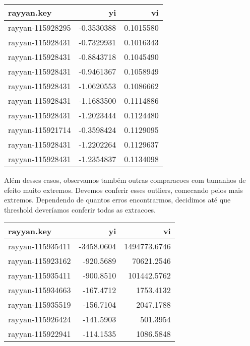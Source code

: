 \documentclass[
]{article}
\begin{document}
\begin{longtable}[]{@{}lrr@{}}
\toprule()
rayyan.key & yi & vi \\
\midrule()
\endhead
rayyan-115928295 & -0.3530388 & 0.1015580 \\
rayyan-115928431 & -0.7329931 & 0.1016343 \\
rayyan-115928431 & -0.8843718 & 0.1045490 \\
rayyan-115928431 & -0.9461367 & 0.1058949 \\
rayyan-115928431 & -1.0620553 & 0.1086662 \\
rayyan-115928431 & -1.1683500 & 0.1114886 \\
rayyan-115928431 & -1.2023444 & 0.1124480 \\
rayyan-115921714 & -0.3598424 & 0.1129095 \\
rayyan-115928431 & -1.2202264 & 0.1129637 \\
rayyan-115928431 & -1.2354837 & 0.1134098 \\
\bottomrule()
\end{longtable}

Além desses casos, observamos também outras comparacoes com tamanhos de
efeito muito extremos. Devemos conferir esses outliers, comecando pelos
mais extremos. Dependendo de quantos erros encontrarmos, decidimos até
que threshold deveríamos conferir todas as extracoes.

\begin{longtable}[]{@{}lrr@{}}
\toprule()
rayyan.key & yi & vi \\
\midrule()
\endhead
rayyan-115935411 & -3458.0604 & 1494773.6746 \\
rayyan-115923162 & -920.5689 & 70621.2546 \\
rayyan-115935411 & -900.8510 & 101442.5762 \\
rayyan-115934663 & -167.4712 & 1753.4132 \\
rayyan-115935519 & -156.7104 & 2047.1788 \\
rayyan-115926424 & -141.5903 & 501.3954 \\
rayyan-115922941 & -114.1535 & 1086.5848 \\
\bottomrule()
\end{longtable}
\end{document}
